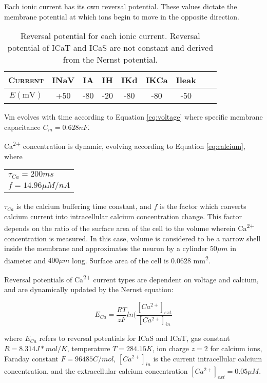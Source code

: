 Each ionic current has its own reversal potential. These values dictate the membrane potential at which ions begin to move in the opposite direction.

\begin{table}[h]
    \centering
    \begin{tabular}{ccccccccc}
         \textsc{Current} & \ac{INaV} & \ac{IA} & \ac{IH} & \ac{IKd} & \ac{IKCa} & \ac{Ileak} \\
         \hline
         $E \mathrm{(mV)}$ & +50 & -80 & -20 & -80 & -80 & -50
    \end{tabular}
    \caption[Reversal potentials for each ion channel.]{Reversal potential for each ionic current. Reversal potential of \ac{ICaT} and \ac{ICaS} are not constant and derived from the Nernst potential.\cite{prinz_alternative_2003}}
    \label{tab:revpotential}
\end{table}

\ac{Vm} evolves with time according to Equation \ref{eq:voltage} where specific membrane capacitance $C_m = 0.628nF$\cite{hodgkin_quantitative_1952}.

Ca\textsuperscript{2+} concentration is dynamic, evolving according to Equation \ref{eq:calcium}, where

   \begin{tabular}{l}
     $\tau_{Ca} = 200ms$ \\
     $f = 14.96 \mu M/nA$
    \end{tabular}
    
$\tau_{Ca}$ is the calcium buffering time constant, and $f$ is the factor which converts calcium current into intracellular calcium concentration change. This factor depends on the ratio of the surface area of the cell to the volume wherein Ca\textsuperscript{2+} concentration is measured\cite{liu_model_1998}. In this case, volume is considered to be a narrow shell inside the membrane and approximates the neuron by a cylinder $50 \mu m$ in diameter and $400 \mu m$ long. Surface area of the cell is 0.0628 mm\textsuperscript{2}\cite{liu_model_1998}.

Reversal potentials of Ca\textsuperscript{2+} current types are dependent on voltage and calcium, and are dynamically updated by the Nernst equation\cite{liu_model_1998}:

\begin{equation}
    E_{Ca} = \frac{RT}{zF} ln(\frac{[Ca^{2+}]_{ext}}{[Ca^{2+}]_{in}}
\end{equation}

where $E_{Ca}$ refers to reversal potentials for \ac{ICaS} and \ac{ICaT}, gas constant $R = 8.314 J*mol/K$, temperature $T = 284.15 K$, ion charge $z = 2$ for calcium ions, Faraday constant $F = 96485 C/mol$, $[Ca^{2+}]_{in}$ is the current intracellular calcium concentration, and the extracellular calcium concentration $[Ca^{2+}]_{ext} = 0.05 \mu M$\cite{prinz_alternative_2003}.

